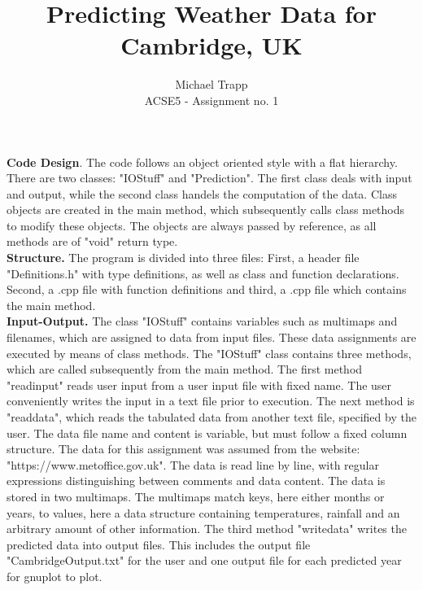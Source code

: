 \documentclass[11pt]{article}
\begin{document}
 
 
\title{Predicting Weather Data for Cambridge, UK}
\author{Michael Trapp\\ %
ACSE5 - Assignment no. 1} %
 
\maketitle
 
{\bf Code Design}. The code follows an object oriented style with a flat hierarchy. There are two classes: "IOStuff" and "Prediction". The first class deals with input and output, while the second class handels the computation of the data. Class objects are created in the main method, which subsequently calls class methods to modify these objects. The objects are always passed by reference, as all methods are of "void" return type. \\  

{\bf Structure.}
The program is divided into three files: First, a header file "Definitions.h" with type definitions, as well as class and function declarations. Second, a .cpp file with function definitions and third, a .cpp file which contains the main method.\\

{\bf Input-Output.}
The class "IOStuff" contains variables such as multimaps and filenames, which are assigned to data from input files. These data assignments are executed by means of class methods. The "IOStuff" class contains three methods, which are called subsequently from the main method. The first method "readinput" reads user input from a user input file with fixed name. The user conveniently writes the input in a text file prior to execution. The next method is "readdata", which reads the tabulated data from another text file, specified by the user. The data file name and content is variable, but must follow a fixed column structure. The data for this assignment was assumed from the website: "https://www.metoffice.gov.uk". The data is read line by line, with regular expressions distinguishing between comments and data content. The data is stored in two multimaps. The multimaps match keys, here either months or years, to values, here a data structure containing temperatures, rainfall and an arbitrary amount of other information. The third method  "writedata" writes the predicted data into output files. This includes the output file "CambridgeOutput.txt" for the user and one output file for each predicted year for gnuplot to plot.\\
\end{document}

